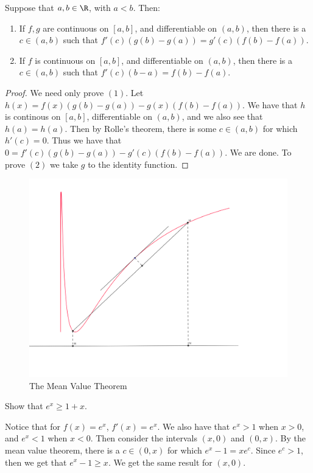 \begin{theorem}\label{4.3.2}
    Suppose that $a,b \in \R$, with  $a<b$. Then:
        \begin{enumerate}[label=(\arabic*)]
            \item If $f, g$ are continuous on  $[a,b]$, and differentiable on  $(a,b)$, then 
                there is a $c \in (a,b)$ such that $f'(c)(g(b)-g(a))=g'(c)(f(b)-f(a))$.

            \item If $f$ is continuous on  $[a,b]$, and differentiable on  $(a,b)$, then there is 
                a  $c \in (a,b)$ such that $f'(c)(b-a)=f(b)-f(a)$.
        \end{enumerate}
\end{theorem}
\begin{proof}
    We need only prove $(1)$. Let  $h(x)=f(x)(g(b)-g(a))-g(x)(f(b)-f(a))$. We have that 
    $h$ is continous on  $[a,b]$, differentiable on $(a,b)$, and we also see that $h(a)=h(a)$.
    Then by Rolle's theorem, there is some  $c \in (a,b)$ for which $h'(c)=0$. Thus 
    we have that  $0=f'(c)(g(b)-g(a))-g'(c)(f(b)-f(a))$. We are done. To prove $(2)$ 
    we take  $g$ to the identity function.
\end{proof}

\begin{figure} 
    \centering
    \includegraphics[scale = 0.3]{figures/meanValueTheorem.png}
    \caption{The Mean Value Theorem}
    \label{fig4.1}
\end{figure}

\begin{example}
    Show that $e^x \geq 1+x$.		
\end{example}
\begin{solution}
    Notice that for $f(x)=e^x$,  $f'(x)=e^x$. We also have that  $e^x>1$ when  $x>0$, 
    and $e^x<1$ when  $x<0$. Then consider the intervals  $(x,0)$ and $(0,x)$. By the 
    mean value theorem, there is a  $c \in (0,x)$ for which $e^x-1=xe^c$. Since $e^c>1$, then 
    we get that  $e^x-1 \geq x$. We get the same result for  $(x,0)$.
\end{solution}

